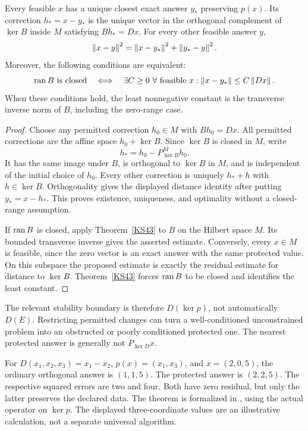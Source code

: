 \begin{theorem}\label{KS56}
Every feasible \(x\) has a unique closest exact answer \(y_*\) preserving \(p(x)\). Its correction \(h_*=x-y_*\) is the unique vector in the orthogonal complement of \(\ker B\) inside \(M\) satisfying \(Bh_*=Dx\). For every other feasible answer \(y\),
\[
 \left\lVert x-y\right\rVert^2=\left\lVert x-y_*\right\rVert^2+\left\lVert y_*-y\right\rVert^2.
\]
Moreover, the following conditions are equivalent:
\[
 \operatorname{ran} B\text{ is closed}
 \quad\Longleftrightarrow\quad
 \exists C\ge0\ \forall\text{ feasible }x:
 \left\lVert x-y_*\right\rVert\le C\left\lVert Dx\right\rVert.
\]
When these conditions hold, the least nonnegative constant is the transverse inverse norm of \(B\), including the zero-range case.
\end{theorem}
\begin{proof}
Choose any permitted correction \(h_0\in M\) with \(Bh_0=Dx\). All permitted corrections are the affine space \(h_0+\ker B\). Since \(\ker B\) is closed in \(M\), write
\[
 h_* = h_0-P_{\ker B}^{M}h_0.
\]
It has the same image under \(B\), is orthogonal to \(\ker B\) in \(M\), and is independent of the initial choice of \(h_0\). Every other correction is uniquely \(h_*+h\) with \(h\in\ker B\). Orthogonality gives the displayed distance identity after putting \(y_*=x-h_*\). This proves existence, uniqueness, and optimality without a closed-range assumption.

If \(\operatorname{ran} B\) is closed, apply Theorem~\ref{KS43} to \(B\) on the Hilbert space \(M\). Its bounded transverse inverse gives the asserted estimate. Conversely, every \(x\in M\) is feasible, since the zero vector is an exact answer with the same protected value. On this subspace the proposed estimate is exactly the residual estimate for distance to \(\ker B\). Theorem~\ref{KS43} forces \(\operatorname{ran} B\) to be closed and identifies the least constant.
\end{proof}
The relevant stability boundary is therefore \(D(\ker p)\), not automatically \(D(E)\). Restricting permitted changes can turn a well-conditioned unconstrained problem into an obstructed or poorly conditioned protected one. The nearest protected answer is generally not \(P_{\ker D}x\).

For \(D(x_1,x_2,x_3)=x_1-x_2\), \(p(x)=(x_1,x_3)\), and \(x=(2,0,5)\), the ordinary orthogonal answer is \((1,1,5)\). The protected answer is \((2,2,5)\). The respective squared errors are two and four. Both have zero residual, but only the latter preserves the declared data. The theorem is formalized in , using the actual operator on \(\ker p\). The displayed three-coordinate values are an illustrative calculation, not a separate universal algorithm.

